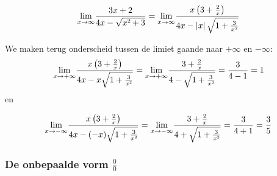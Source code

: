 \begin{itemize}
\begin{voorbeeld}
\end{voorbeeld}



\begin{voorbeeld}
	\begin{equation*}
{\displaystyle {\displaystyle \lim_{x\to\infty}}\frac{3x+2}{4x-\sqrt{x\text{\texttwosuperior}+3}}={\displaystyle \lim_{x\to\infty}}\frac{x\left(3+\frac{2}{x}\right)}{4x-\left|x\right|\sqrt{1+\frac{3}{x\text{\texttwosuperior}}}}}
\end{equation*}

We maken terug onderscheid tussen de limiet gaande naar $+\infty$
en $-\infty$:
\begin{equation*}
{\displaystyle \lim_{x\to+\infty}}{\displaystyle \frac{x\left(3+\frac{2}{x}\right)}{4x-x\sqrt{1+\frac{3}{x\text{\texttwosuperior}}}}={\displaystyle \lim_{x\to+\infty}}{\displaystyle \frac{3+\frac{2}{x}}{4-\sqrt{1+\frac{3}{x\text{\texttwosuperior}}}}=\frac{3}{4-1}=1}}
\end{equation*} en

\begin{equation*}
{\displaystyle \lim_{x\to-\infty}}{\displaystyle \frac{x\left(3+\frac{2}{x}\right)}{4x-(-x)\sqrt{1+\frac{3}{x\text{\texttwosuperior}}}}={\displaystyle \lim_{x\to-\infty}}{\displaystyle \frac{3+\frac{2}{x}}{4+\sqrt{1+\frac{3}{x\text{\texttwosuperior}}}}=\frac{3}{4+1}=\frac{3}{5}}}
\end{equation*}

\end{voorbeeld}
\end{itemize}

\subsubsection{De onbepaalde vorm $\frac{0}{0}$}

